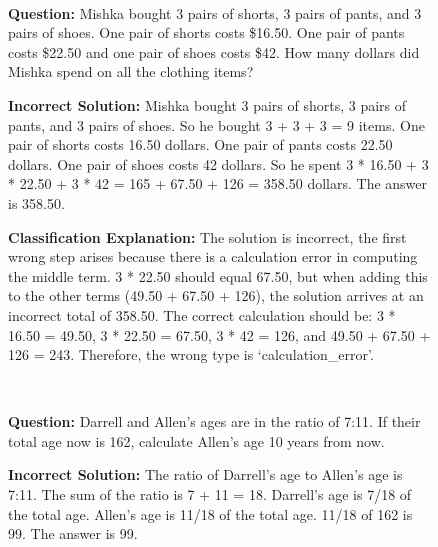 \begin{figure}[!ht]
\begin{minipage}{0.9\textwidth}
\begin{tcolorbox}[boxrule=0.5mm, left=1mm, right=1mm, top=1mm, bottom=1mm,title=\textbf{Confusing Concept Error}]
        \end{tcolorbox}
    \end{minipage}
    \\
    \begin{minipage}{0.9\textwidth}
        \begin{tcolorbox}[boxrule=0.5mm, left=1mm, right=1mm, top=1mm, bottom=1mm,title=\textbf{Calculation Error}]
            \textbf{Question:}
            Mishka bought 3 pairs of shorts, 3 pairs of pants, and 3 pairs of shoes. One pair of shorts costs \$16.50. One pair of pants costs \$22.50 and one pair of shoes costs \$42. How many dollars did Mishka spend on all the clothing items?

            \textbf{Incorrect Solution:}
            Mishka bought 3 pairs of shorts, 3 pairs of pants, and 3 pairs of shoes. So he bought 3 + 3 + 3 = 9 items. One pair of shorts costs 16.50 dollars. One pair of pants costs 22.50 dollars. One pair of shoes costs 42 dollars. So he spent 3 * 16.50 + 3 * 22.50 + 3 * 42 = 165 + 67.50 + 126 = 358.50 dollars. The answer is 358.50.
            
            \textbf{Classification Explanation:}
            The solution is incorrect, the first wrong step arises because there is a calculation error in computing the middle term. 3 * 22.50 should equal 67.50, but when adding this to the other terms (49.50 + 67.50 + 126), the solution arrives at an incorrect total of 358.50. The correct calculation should be: 3 * 16.50 = 49.50, 3 * 22.50 = 67.50, 3 * 42 = 126, and 49.50 + 67.50 + 126 = 243. Therefore, the wrong type is `calculation\_error'.

        \end{tcolorbox}
    \end{minipage}
    \\
    \begin{minipage}{0.9\textwidth}
        \begin{tcolorbox}[boxrule=0.5mm, left=1mm, right=1mm, top=1mm, bottom=1mm,title=\textbf{Missing Step Error}]
            \textbf{Question:}
            Darrell and Allen's ages are in the ratio of 7:11. If their total age now is 162, calculate Allen's age 10 years from now.

            \textbf{Incorrect Solution:}
            The ratio of Darrell's age to Allen's age is 7:11. The sum of the ratio is 7 + 11 = 18. Darrell's age is 7/18 of the total age. Allen's age is 11/18 of the total age. 11/18 of 162 is 99. The answer is 99.


\end{tcolorbox}
\end{minipage}
\end{figure}
